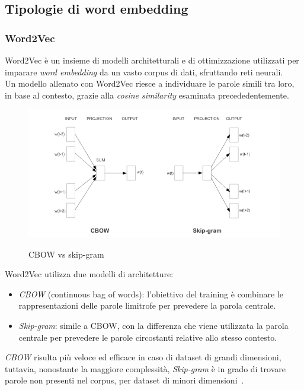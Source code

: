 \subsection{Tipologie di word embedding}
\label{sec:tipologie di word embedding}
\subsubsection{Word2Vec}
\label{sec:word2vec}
Word2Vec è un insieme di modelli architetturali e di ottimizzazione utilizzati per imparare \emph{word embedding} da un vasto corpus di dati, sfruttando reti neurali.
\\
Un modello allenato con Word2Vec riesce a individuare le parole simili tra loro, in base al contesto, grazie alla \textit{cosine similarity} esaminata precededentemente.

\begin{figure}[h]
    \centering
    \includegraphics[width=15cm]{./immagini/cbow_vs_skipgram.png}
    \label{cbowskipgram}
    \caption{CBOW vs skip-gram~\cite{mikolov2013efficient}}
\end{figure}
\newpage
Word2Vec utilizza due modelli di architetture:
\begin{itemize}
    \item \emph{CBOW} (continuous bag of words): l'obiettivo del training è combinare le rappresentazioni delle parole limitrofe per prevedere la parola centrale.
    \item \emph{Skip-gram}: simile a CBOW, con la differenza che viene utilizzata la parola centrale per prevedere le parole circostanti relative allo stesso contesto.
\end{itemize}

\emph{CBOW} risulta più veloce ed efficace in caso di dataset di grandi dimensioni, tuttavia, nonostante la maggiore complessità, \emph{Skip-gram} è in grado di trovare parole non presenti nel corpus, per dataset di minori dimensioni~\cite{mikolov2013efficient}.


